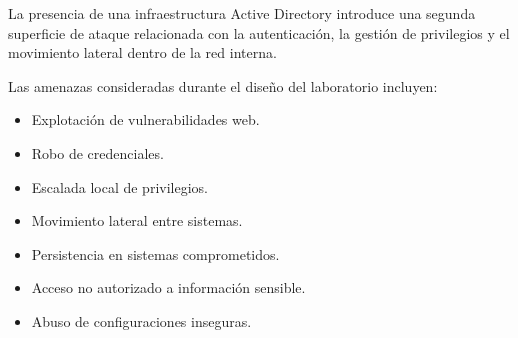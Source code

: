 La presencia de una infraestructura Active Directory introduce una segunda superficie de ataque relacionada con la autenticación, la gestión de privilegios y el movimiento lateral dentro de la red interna.

Las amenazas consideradas durante el diseño del laboratorio incluyen:








\begin{itemize} 
    \item Explotación de vulnerabilidades web. 
    \item Robo de credenciales.
    \item Escalada local de privilegios. 
    \item Movimiento lateral entre sistemas. 
    \item Persistencia en sistemas comprometidos. 
    \item Acceso no autorizado a información sensible. 
    \item Abuso de configuraciones inseguras. 
\end{itemize}
\vspace{0.5cm}
\renewcommand{\arraystretch}{1.2}

